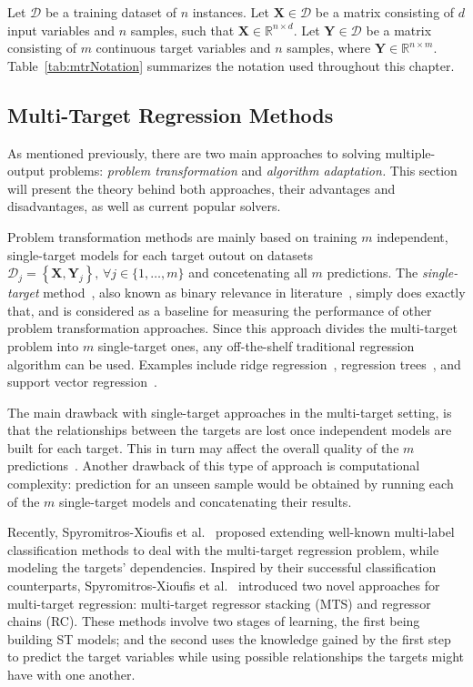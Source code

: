 \documentclass[reqno]{vcuthesis}
\newcommand{\set}[1]{{\left\{#1\right\}}}
\numberwithin{equation}{chapter}
\begin{document}
Let $\mathcal{D}$ be a training dataset of $n$ instances. Let $\bm{X} \in \mathcal{D}$ be a matrix consisting of $d$ input variables and $n$ samples, such that $\bm{X} \in \mathbb{R}^{n \times d}$. Let $\bm{Y} \in \mathcal{D}$ be a matrix consisting of $m$ continuous target variables and $n$ samples,  where $\bm{Y} \in \mathbb{R}^{n \times m}$. Table~\ref{tab:mtrNotation} summarizes the notation used throughout this chapter.

\subsection{Multi-Target Regression Methods}
As mentioned previously, there are two main approaches to solving multiple-output problems: \textit{problem transformation} and \textit{algorithm adaptation.} This section will present the theory behind both approaches, their advantages and disadvantages, as well as current popular solvers.

Problem transformation methods are mainly based on training $m$ independent, single-target models for each target outout on datasets $\mathcal{D}_j = \set{\bm X, \bm Y_j},\, \forall j \in \{1, \ldots, m\}$ and concetenating all $m$ predictions. The \textit{single-target} method~\cite{Spyromitros2014}, also known as binary relevance in literature~\cite{Zhang20141819}, simply does exactly that, and is considered as a baseline for measuring the performance of other problem transformation approaches. Since this approach divides the multi-target problem into $m$ single-target ones, any off-the-shelf traditional regression algorithm can be used. Examples include ridge regression~\cite{hoerl1970ridge}, regression trees~\cite{Breiman1996}, and support vector regression~\cite{Drucker1997}.

The main drawback with single-target approaches in the multi-target setting, is that the relationships between the targets are lost once independent models are built for each target. This in turn may affect the overall quality of the $m$ predictions~\cite{Borchani2015}. Another drawback of this type of approach is computational complexity: prediction for an unseen sample would be obtained by running each of the $m$ single-target models and concatenating their results. 

Recently, Spyromitros-Xioufis et al.~\cite{Spyromitros2014} proposed extending well-known multi-label classification methods to deal with the multi-target regression problem, while modeling the targets' dependencies. Inspired by their successful classification counterparts, Spyromitros-Xioufis et al.~\cite{Spyromitros2014} introduced two novel approaches for multi-target regression: multi-target regressor stacking (MTS) and regressor chains (RC). These methods involve two stages of learning, the first being building ST models; and the second uses the knowledge gained by the first step to predict the target variables while using possible relationships the targets might have with one another. 
\end{document}
